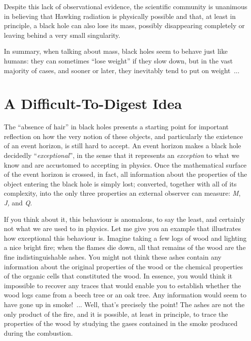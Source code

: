 Despite this lack of observational evidence, the scientific community is unanimous in
believing that Hawking radiation is physically possible and that, at
least in principle, a black hole can also lose its mass, possibly disappearing
completely or leaving behind a very small singularity.

In summary, when talking about mass, black holes seem to behave just like humans: they
can sometimes ``lose weight'' if they slow down, but in the vast majority of cases, and
sooner or later, they inevitably tend to put on weight~...

\section{A Difficult-To-Digest Idea}\label{sec:06-idea}

The ``absence of hair'' in black holes presents a starting point for important
reflection on how the very notion of these objects, and particularly the existence of an
event horizon, is still hard to accept. An event horizon makes a black
hole decidedly ``\emph{exceptional}'', in the sense that it represents an
\emph{exception} to what we know and are accustomed to accepting in physics. Once the
mathematical surface of the event horizon is crossed, in fact, all information about the
properties of the object entering the black hole is simply lost; converted, together
with all of its complexity, into the only three properties an external observer can
measure: \emph{M}, \emph{J,} and \emph{Q}.

If you think about it, this behaviour is anomalous, to say the least, and certainly not
what we are used to in physics. Let me give you an example that illustrates how
exceptional this behaviour is. Imagine taking a few logs of wood and lighting a nice
bright fire; when the flames die down, all that remains of the wood are the fine
indistinguishable ashes. You might not think these ashes contain any information about
the original properties of the wood or the chemical properties of the organic cells that
constituted the wood. In essence, you would think it impossible to recover any traces
that would enable you to establish whether the wood logs came from a beech tree or an
oak tree. Any information would seem to have gone up in smoke!~... Well, that's
precisely the point! The ashes are not the only product of the fire, and it is possible,
at least in principle, to trace the properties of the wood by studying the gases
contained in the smoke produced during the combustion.

